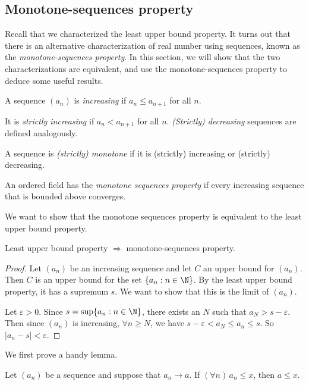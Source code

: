 \documentclass[a4paper]{article}
\begin{document}
\subsection{Monotone-sequences property}
Recall that we characterized the least upper bound property. It turns out that there is an alternative characterization of real number using sequences, known as the \emph{monotone-sequences property}. In this section, we will show that the two characterizations are equivalent, and use the monotone-sequences property to deduce some useful results.
\begin{defi}
  A sequence $(a_n)$ is \emph{increasing} if $a_n\leq a_{n + 1}$ for all $n$.

  It is \emph{strictly increasing} if $a_n < a_{n + 1}$ for all $n$. \emph{(Strictly) decreasing} sequences are defined analogously.

  A sequence is \emph{(strictly) monotone} if it is (strictly) increasing or (strictly) decreasing.
\end{defi}

\begin{defi}
  An ordered field has the \emph{monotone sequences property} if every increasing sequence that is bounded above converges.
\end{defi}

We want to show that the monotone sequences property is equivalent to the least upper bound property.
\begin{lemma}
  Least upper bound property $\Rightarrow$ monotone-sequences property.
\end{lemma}

\begin{proof}
  Let $(a_n)$ be an increasing sequence and let $C$ an upper bound for $(a_n)$. Then $C$ is an upper bound for the set $\{a_n: n \in \N\}$. By the least upper bound property, it has a supremum $s$. We want to show that this is the limit of $(a_n)$.

  Let $\varepsilon > 0$. Since $s = \sup \{a_n: n\in \N\}$, there exists an $N$ such that $a_N > s - \varepsilon$. Then since $(a_n)$ is increasing, $\forall n \geq N$, we have $s - \varepsilon < a_N \leq a_n \leq s$. So $|a_n - s| < \varepsilon$.
\end{proof}

We first prove a handy lemma.
\begin{lemma}
  Let $(a_n)$ be a sequence and suppose that $a_n \to a$. If $(\forall n)\, a_n \leq x$, then $a\leq x$.
\end{lemma}
\end{document}
